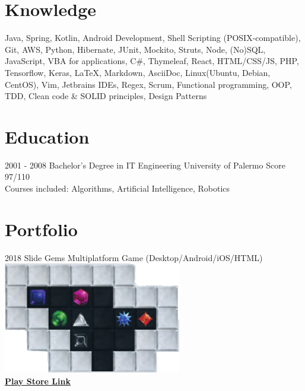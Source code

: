 \documentclass[]{friggeri-cv}
\begin{document}
\newpage

\section{Knowledge}
{Java, Spring, Kotlin, Android Development, Shell Scripting {\tiny(POSIX-compatible)}, Git, AWS, Python, Hibernate, JUnit, Mockito, Struts, Node, {\tiny(No)}SQL, JavaScript, VBA for applications, C\#, Thymeleaf, React, HTML/CSS/JS, PHP, Tensorflow, Keras, \LaTeX, Markdown, AsciiDoc, Linux{\tiny(Ubuntu, Debian, CentOS)}, Vim, Jetbrains IDEs, Regex, Scrum, Functional programming, OOP, TDD, Clean code \& SOLID principles, Design Patterns}

\section{Education}
\begin{entrylist}
  \entry
    {2001 - 2008}
    {Bachelor's Degree in IT Engineering}
    {University of Palermo}
    {Score 97/110\\
    Courses included: Algorithms, Artificial Intelligence, Robotics}
\end{entrylist}

\section{Portfolio}
\begin{entrylist}
  \entry
    {2018}
    {Slide Gems}
    {Multiplatform Game (Desktop/Android/iOS/HTML)}
    {{\includegraphics[scale=0.50]{img/slide_gems_snip.png}}\\\href{https://bit.ly/2Gwwct5}{\textbf{Play Store Link}}}
    
    
     
\end{entrylist}
\end{document}
